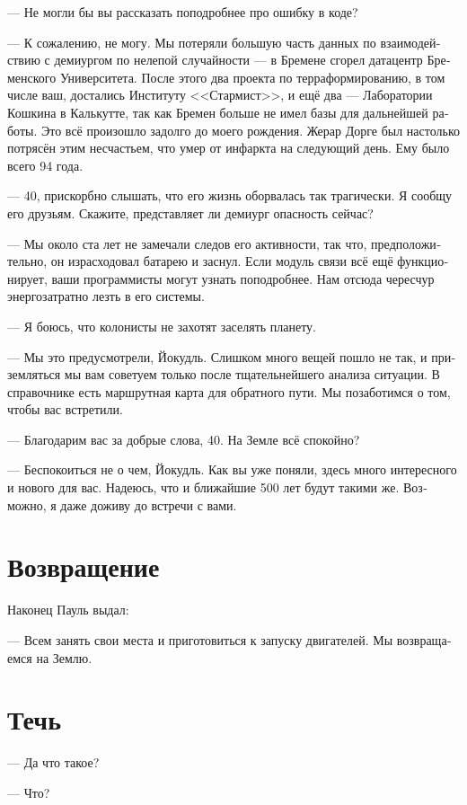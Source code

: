 \documentclass[a4paper,10pt,fleqn]{book}\usepackage{polyglossia}\setdefaultlanguage[babelshorthands=true]{russian}\setotherlanguage{english}\defaultfontfeatures{Ligatures=TeX,Mapping=tex-text}\usepackage{xcolor}\newcommand{\ml}[3]{#2}
\begin{document}
--- Не могли бы вы рассказать поподробнее про ошибку в коде?

--- К сожалению, не могу.
Мы потеряли большую часть данных по взаимодействию с демиургом по нелепой случайности --- в Бремене сгорел датацентр Бременского Университета.
После этого два проекта по терраформированию, в том числе ваш, достались Институту <<Стармист>>, и ещё два --- Лаборатории Кошкина в Калькутте, так как Бремен больше не имел базы для дальнейшей работы.
Это всё произошло задолго до моего рождения.
Жерар Дорге был настолько потрясён этим несчастьем, что умер от инфаркта на следующий день.
Ему было всего 94 года.

--- 40, прискорбно слышать, что его жизнь оборвалась так трагически.
Я сообщу его друзьям.
Скажите, представляет ли демиург опасность сейчас?

--- Мы около ста лет не замечали следов его активности, так что, предположительно, он израсходовал батарею и заснул.
Если модуль связи всё ещё функционирует, ваши программисты могут узнать поподробнее.
Нам отсюда чересчур энергозатратно лезть в его системы.

--- Я боюсь, что колонисты не захотят заселять планету.

--- Мы это предусмотрели, Йокудль.
Слишком много вещей пошло не так, и приземляться мы вам советуем только после тщательнейшего анализа ситуации.
В справочнике есть маршрутная карта для обратного пути.
Мы позаботимся о том, чтобы вас встретили.

--- Благодарим вас за добрые слова, 40.
На Земле всё спокойно?

--- Беспокоиться не о чем, Йокудль.
Как вы уже поняли, здесь много интересного и нового для вас.
Надеюсь, что и ближайшие 500 лет будут такими же.
Возможно, я даже доживу до встречи с вами.

\section{Возвращение}

Наконец Пауль выдал:

--- Всем занять свои места и приготовиться к запуску двигателей.
Мы возвращаемся на Землю.

\section{Течь}

--- Да что такое?

--- Что?
\end{document}
